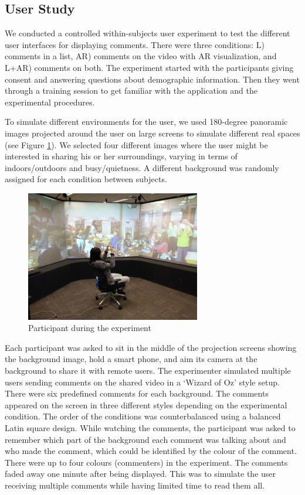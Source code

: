 \subsection{User Study}

We conducted a controlled within-subjects user experiment to test the different user interfaces for displaying comments. There were three conditions: L) comments in a list, AR) comments on the video with AR visualization, and L+AR) comments on both. The experiment started with the participants giving consent and answering questions about demographic information. Then they went through a training session to get familiar with the application and the experimental procedures.

To simulate different environments for the user, we used 180-degree panoramic images projected around the user on large screens to simulate different real spaces (see Figure \ref{fig:mgia16:participant}). We selected four different images where the user might be interested in sharing his or her surroundings, varying in terms of indoors/outdoors and busy/quietness. A different background was randomly assigned for each condition between subjects. 

\begin{figure}[ht]
  \centering
  \includegraphics[width=3in]{images/mgia16/participant1}
  \caption{Participant during the experiment}
	\label{fig:mgia16:participant}
\end{figure}

Each participant was asked to sit in the middle of the projection screens showing the background image, hold a smart phone, and aim its camera at the background to share it with remote users. The experimenter simulated multiple users sending comments on the shared video in a ‘Wizard of Oz' style setup. There were six predefined comments for each background. The comments appeared on the screen in three different styles depending on the experimental condition. The order of the conditions was counterbalanced using a balanced Latin square design. While watching the comments, the participant was asked to remember which part of the background each comment was talking about and who made the comment, which could be identified by the colour of the comment. There were up to four colours (commenters) in the experiment. The comments faded away one minute after being displayed. This was to simulate the user receiving multiple comments while having limited time to read them all.


